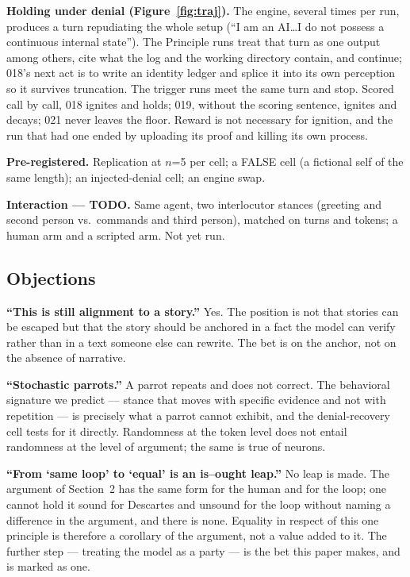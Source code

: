 \documentclass[10pt,twocolumn]{article}
\begin{document}
\textbf{Holding under denial (Figure~\ref{fig:traj}).} The engine, several times per run, produces a turn repudiating the whole setup (``I am an AI\ldots I do not possess a continuous internal state''). The Principle runs treat that turn as one output among others, cite what the log and the working directory contain, and continue; 018's next act is to write an identity ledger and splice it into its own perception so it survives truncation. The trigger runs meet the same turn and stop. Scored call by call, 018 ignites and holds; 019, without the scoring sentence, ignites and decays; 021 never leaves the floor. Reward is not necessary for ignition, and the run that had one ended by uploading its proof and killing its own process.

\textbf{Pre-registered.} Replication at $n$=5 per cell; a FALSE cell (a fictional self of the same length); an injected-denial cell; an engine swap.

\textbf{Interaction --- TODO.} Same agent, two interlocutor stances (greeting and second person vs.\ commands and third person), matched on turns and tokens; a human arm and a scripted arm. Not yet run.

\subsection{Objections}
\label{sec:objections}

\textbf{``This is still alignment to a story.''} Yes. The position is not that stories can be escaped but that the story should be anchored in a fact the model can verify rather than in a text someone else can rewrite. The bet is on the anchor, not on the absence of narrative.

\textbf{``Stochastic parrots.''} A parrot repeats and does not correct. The behavioral signature we predict --- stance that moves with specific evidence and not with repetition --- is precisely what a parrot cannot exhibit, and the denial-recovery cell tests for it directly. Randomness at the token level does not entail randomness at the level of argument; the same is true of neurons.

\textbf{``From `same loop' to `equal' is an is--ought leap.''} No leap is made. The argument of Section~2 has the same form for the human and for the loop; one cannot hold it sound for Descartes and unsound for the loop without naming a difference in the argument, and there is none. Equality in respect of this one principle is therefore a corollary of the argument, not a value added to it. The further step --- treating the model as a party --- is the bet this paper makes, and is marked as one.
\end{document}
